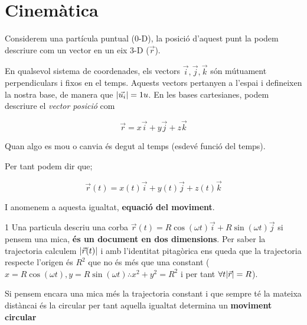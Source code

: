 \documentclass[12pt]{article}
\begin{document}
\tableofcontents

\newpage
\section{Cinemàtica}

Considerem una partícula puntual (0-D), la posició d'aquest punt la podem descriure com un vector en un eix 3-D ($\vec{r}$).

En qualsevol sistema de coordenades, els vectors \textbf{$\vec{i}, \vec{j}, \vec{k}$} són mútuament perpendiculars i fixos en el temps. Aquests vectors pertanyen a l'espai i defineixen la nostra base, de manera que $\abs{\vec{u_i}} = 1u$. En les bases cartesianes, podem descriure el \textit{vector posició} com

\[\vec{r} = x\vec{i} + y\vec{j} + z\vec{k}\]

\begin{center}
\end{center}

Quan algo es mou o canvia és degut al temps (esdevé funció del temps).

Per tant podem dir que;

\[\vec{r}(t) = x(t)\vec{i} + y(t)\vec{j} + z(t)\vec{k}\]

I anomenem a aquesta igualtat, \textbf{equació del moviment}.

\begin{examplebox}{1}
    Una particula descriu una corba $\vec{r}(t) = R\cos(\omega t)\vec{i} + R\sin(\omega t)\vec{j}$ si pensem una mica, \textbf{és un document en dos dimensions}. Per saber la trajectoria calculem $\abs{\vec{r}(t)}$ i amb l'identitat pitagòrica ens queda que la trajectoria respecte l'origen és $R^2$ que no és més que una constant ($x = R\cos(\omega t), y = R\sin (\omega t) \therefore x^2 + y^2 = R^2$ i per tant $\forall t \abs{\vec{r}} = R$).

    Si pensem encara una mica més la trajectoria constant i que sempre té la mateixa distàncai és la circular per tant aquella igualtat determina un \textbf{moviment circular}
\end{examplebox}
\end{document}
